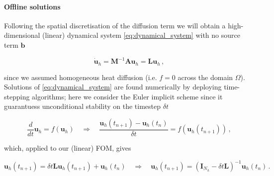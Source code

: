 \documentclass[../main.tex]{subfiles}
\begin{document}
\paragraph{Offline solutions}\label{par:heat_fom}

Following the spatial discretisation of the diffusion term we will obtain a high-dimensional (linear) dynamical system \eqref{eq:dynamical_system} with no source term $\boldsymbol{b}$

\begin{equation*}
        \dot{\boldsymbol{u}}_{h}=\boldsymbol{M}^{-1}\boldsymbol{A}\boldsymbol{u}_{h} = \boldsymbol{L}\boldsymbol{u}_{h}\,,
\end{equation*}

since we assumed homogeneous heat diffusion (i.e. $f=0$ across the domain $\Omega$).
Solutions of \eqref{eq:dynamical_system} are found numerically by deploying time-stepping algorithms; here we consider the Euler implicit scheme since it guarantuess unconditional stability on the timestep $\delta t$

\begin{equation}\label{eq:euler_implicit}
     \frac{d}{dt}\boldsymbol{u}_{h}=f(\boldsymbol{u}_{h})\quad\Rightarrow\quad \frac{\boldsymbol{u}_{h}(t_{n+1}) - \boldsymbol{u}_{h}(t_{n})}{\delta t} = f(\boldsymbol{u}_{h}(t_{n+1}))\,,
\end{equation}

which, applied to our (linear) FOM, gives

\begin{equation}\label{eq:heat_fom}
        \boldsymbol{u}_{h}(t_{n+1}) = \delta t \boldsymbol{L}\boldsymbol{u}_{h}(t_{n+1}) + \boldsymbol{u}_{h}(t_{n})\quad\Rightarrow\quad \boldsymbol{u}_{h}(t_{n+1}) = (\boldsymbol{I}_{N_{h}} - \delta t \boldsymbol{L})^{-1}\boldsymbol{u}_{h}(t_{n})\,.
\end{equation}



\end{document}
